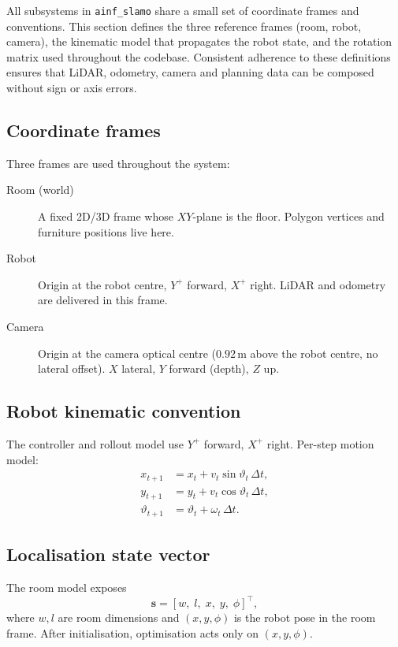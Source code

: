 \documentclass[a4paper, 11pt]{article}
\newcommand{\vect}[1]{\bm{#1}}
\begin{document}
All subsystems in \texttt{ainf\_slamo} share a small set of coordinate
frames and conventions.  This section defines the three reference frames
(room, robot, camera), the kinematic model that propagates the robot
state, and the rotation matrix used throughout the codebase.  Consistent
adherence to these definitions ensures that LiDAR, odometry, camera and
planning data can be composed without sign or axis errors.

\subsection{Coordinate frames}

Three frames are used throughout the system:

\begin{description}
  \item[Room (world)] A fixed 2D/3D frame whose $XY$-plane is the floor.
    Polygon vertices and furniture positions live here.
  \item[Robot] Origin at the robot centre, $Y^+$ forward, $X^+$ right.
    LiDAR and odometry are delivered in this frame.
  \item[Camera] Origin at the camera optical centre ($0.92\,$m above the
    robot centre, no lateral offset).
    $X$ lateral, $Y$ forward (depth), $Z$ up.
\end{description}

\subsection{Robot kinematic convention}

The controller and rollout model use $Y^+$ forward, $X^+$ right.
Per-step motion model:
\begin{equation}\label{eq:motion-model}
\begin{aligned}
  x_{t+1} &= x_t + v_t \sin\vartheta_t\,\Delta t, \\
  y_{t+1} &= y_t + v_t \cos\vartheta_t\,\Delta t, \\
  \vartheta_{t+1} &= \vartheta_t + \omega_t\,\Delta t.
\end{aligned}
\end{equation}

\subsection{Localisation state vector}

The room model exposes
\begin{equation}
  \vect{s} = [w,\; l,\; x,\; y,\; \phi]^\top,
\end{equation}
where $w, l$ are room dimensions and $(x, y, \phi)$ is the robot pose in the
room frame.  After initialisation, optimisation acts only on $(x, y, \phi)$.
\end{document}
